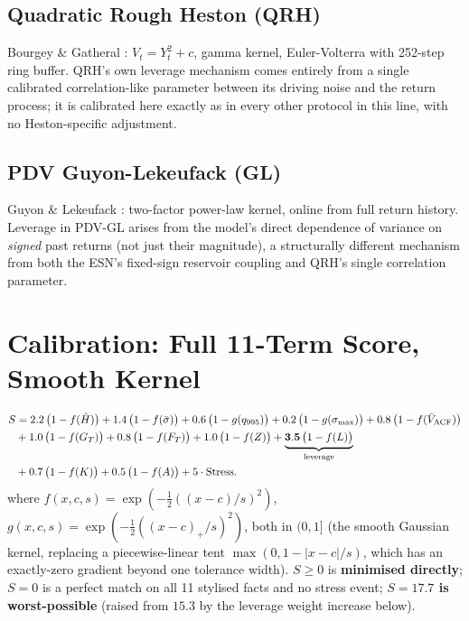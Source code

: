 \documentclass[11pt,a4paper]{article}
\begin{document}
\subsection{Quadratic Rough Heston (QRH)}
Bourgey \& Gatheral \cite{bourgey2026}: $V_t=Y_t^2+c$, gamma kernel,
Euler-Volterra with 252-step ring buffer. QRH's own leverage mechanism
comes entirely from a single calibrated correlation-like parameter
between its driving noise and the return process; it is calibrated
here exactly as in every other protocol in this line, with no
Heston-specific adjustment.

\subsection{PDV Guyon-Lekeufack (GL)}
Guyon \& Lekeufack \cite{guyon2023}: two-factor power-law kernel,
online from full return history. Leverage in PDV-GL arises from the
model's direct dependence of variance on \emph{signed} past returns
(not just their magnitude), a structurally different mechanism from
both the ESN's fixed-sign reservoir coupling and QRH's single
correlation parameter.

\section{Calibration: Full 11-Term Score, Smooth Kernel}
\label{sec:calib}

\begin{equation}
\begin{aligned}
S &= 2.2\,\bigl(1-f(\hat H)\bigr)+1.4\,\bigl(1-f(\bar\sigma)\bigr)+0.6\,\bigl(1-g(q_{995})\bigr)+0.2\,\bigl(1-g(\sigma_{\max})\bigr)
   +0.8\,\bigl(1-f(\bar V_{\rm ACF})\bigr)\\
  &+1.0\,\bigl(1-f(G_T)\bigr)+0.8\,\bigl(1-f(F_T)\bigr)+1.0\,\bigl(1-f(Z)\bigr)
   +\underbrace{\mathbf{3.5}\,\bigl(1-f(L)\bigr)}_{\text{leverage}}\\
  &+0.7\,\bigl(1-f(K)\bigr)+0.5\,\bigl(1-f(A)\bigr)+5\cdot\mathrm{Stress}.
\end{aligned}
\label{eq:score}
\end{equation}
where $f(x,c,s)=\exp(-\tfrac12((x-c)/s)^2)$,
$g(x,c,s)=\exp(-\tfrac12((x-c)_+/s)^2)$, both in $(0,1]$ (the smooth
Gaussian kernel, replacing a piecewise-linear
tent $\max(0,1-|x-c|/s)$, which has an exactly-zero gradient beyond one
tolerance width). $S\geq0$ is \textbf{minimised directly}; $S=0$ is a
perfect match on all 11 stylised facts and no stress event;
\textbf{$S=17.7$ is worst-possible} (raised from $15.3$ by the
leverage weight increase below).
\end{document}
